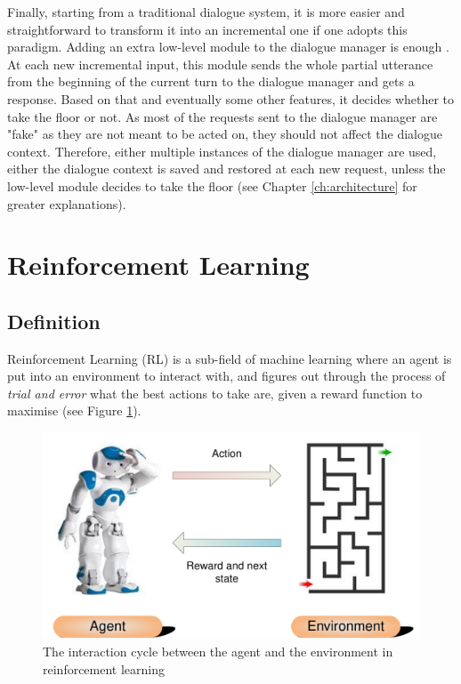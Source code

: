 				Finally, starting from a traditional dialogue system, it is more easier and straightforward to transform it into an incremental one if one adopts this paradigm. Adding an extra low-level module to the dialogue manager is enough \cite{Selfridge2012a}. At each new incremental input, this module sends the whole partial utterance from the beginning of the current turn to the dialogue manager and gets a response. Based on that and eventually some other features, it decides whether to take the floor or not. As most of the requests sent to the dialogue manager are "fake" as they are not meant to be acted on, they should not affect the dialogue context. Therefore, either multiple instances of the dialogue manager are used, either the dialogue context is saved and restored at each new request, unless the low-level module decides to take the floor (see Chapter \ref{ch:architecture} for greater explanations).

\section{Reinforcement Learning}
\label{soa:rl}
	\subsection{Definition}
    
    	Reinforcement Learning (RL) is a sub-field of machine learning where an agent is put into an environment to interact with, and figures out through the process of \textit{trial and error} what the best actions to take are, given a reward function to maximise \cite{Sutton1998} (see Figure \ref{fig:rlscheme}).
        
        \begin{figure}[ht]
          \centering
          \includegraphics[scale=0.8]{figures/AgentEnv.pdf}
          \caption{The interaction cycle between the agent and the environment in reinforcement learning}
          \label{fig:rlscheme}
        \end{figure}
        
